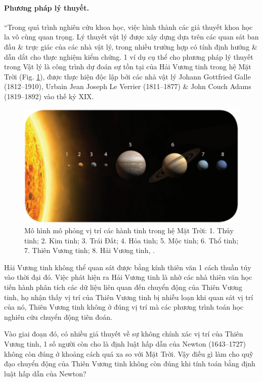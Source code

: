 \documentclass[oneside]{book}
\numberwithin{equation}{section}
\begin{document}
\paragraph{Phương pháp lý thuyết.} ``Trong quá trình nghiên cứu khoa học, việc hình thành các giả thuyết khoa học la vô cùng quan trọng. Lý thuyết vật lý được xây dựng dựa trên các quan sát ban đầu \& trực giác của các nhà vật lý, trong nhiều trường hợp có tính định hướng \& dẫn dắt cho thực nghiệm kiểm chứng. 1 ví dụ cụ thể cho phương pháp lý thuyết trong Vật lý là công trình dự đoán sự tồn tại của Hải Vương tinh trong hệ Mặt Trời (Fig. \ref{fig:cac hanh tinh trong he Mat Troi}), được thực hiện độc lập bởi các nhà vật lý Johann Gottfried Galle (1812--1910), Urbain Jean Joseph Le Verrier (1811--1877) \& John Couch Adams (1819--1892) vào thế kỷ XIX.

\begin{figure}[H]
	\centering
	\includegraphics[scale=0.2]{cac_hanh_tinh_trong_he_Mat_Troi}
	\caption{Mô hình mô phỏng vị trí các hành tinh trong hệ Mặt Trời: 1. Thủy tinh; 2. Kim tinh; 3. Trái Đất; 4. Hỏa tinh; 5. Mộc tinh; 6. Thổ tinh; 7. Thiên Vương tinh; 8. Hải Vương tinh, \cite[Hình 1.4, p. 7]{SGK_Vat_Ly_10_Chan_Troi_Sang_Tao}.}
	\label{fig:cac hanh tinh trong he Mat Troi}
\end{figure}
Hải Vương tinh không thể quan sát được bằng kính thiên văn 1 cách thuần túy vào thời đại đó. Việc phát hiện ra Hải Vương tinh là nhờ các nhà thiên văn học tiến hành phân tích các dữ liệu liên quan đến chuyển động của Thiên Vương tinh, họ nhận thấy vị trí của Thiên Vương tinh bị nhiễu loạn khi quan sát vị trí của nó, Thiên Vương tinh không ở đúng vị trí mà các phương trình toán học nghiên cứu chuyển động tiên đoán.

Vào giai đoạn đó, có nhiều giả thuyết về sự không chính xác vị trí của Thiên Vương tinh, 1 số người còn cho là định luật hấp dẫn của Newton (1643--1727) không còn đúng ở khoảng cách quá xa so với Mặt Trời. Vậy điều gì làm cho quỹ đạo chuyển động của Thiên Vương tinh không còn đúng khi tính toán bằng định luật hấp dẫn của Newton?
\end{document}
